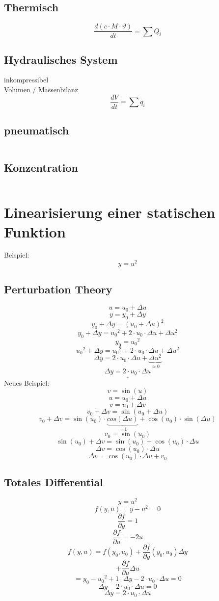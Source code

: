 \subsection{Thermisch}
\[ \boxed{\frac{d(c \cdot M \cdot \vartheta)}{dt} = \sum Q_i} \]

\subsection{Hydraulisches System}
inkompressibel \\
Volumen / Massenbilanz
\[ \boxed{\frac{dV}{dt} = \sum q_i} \]

\subsection{pneumatisch}
\[ \boxed{} \]

\subsection{Konzentration}
\[ \boxed{} \]

\section{Linearisierung einer statischen Funktion}
Beispiel: 
\[ y = u^2 \]

\subsection{Perturbation Theory}
\[ u = u_0 + \Delta u \]
\[ y = y_0 + \Delta y \]
\[ y_0 + \Delta y = (u_0 + \Delta u)^2 \]
\[ y_0 + \Delta y = {u_0}^2 + 2 \cdot u_0 \cdot \Delta u + \Delta u ^2 \]
\[ y_0 = {u_0}^2 \]
\[ {u_0}^2 + \Delta y = {u_0}^2 + 2 \cdot u_0 \cdot \Delta u + \Delta u^2 \]
\[ \Delta y = 2 \cdot u_0 \cdot \Delta u + \underbrace{\Delta u^2}_{\approx 0} \]
\[ \underline{\underline{\Delta y = 2 \cdot u_0 \cdot \Delta u}} \]
%
Neues Beispiel: 
\[ v = \sin(u) \]
\[ u = u_0 + \Delta u \]
\[ v = v_0 + \Delta v \]
\[ v_0 + \Delta v = \sin(u_0 + \Delta u) \]
\[ v_0 + \Delta v = \sin(u_0) \cdot \underbrace{cos(\Delta u)}_{=1} 
+ \cos(u_0) \cdot \sin(\Delta u) \]
\[ v_0 = \sin(u_0) \]
\[ \sin(u_0) + \Delta v = \sin(u_0) + \cos(u_0) \cdot \Delta u \]
\[ \Delta v = \cos(u_0) \cdot \Delta u \]
\[ \Delta v = \cos(u_0) \cdot \Delta u + v_0 \]

\subsection{Totales Differential}
\[ y = u^2 \]
\[ f(y, u) = y - u^2 = 0 \]
\[ \frac{\partial f}{\partial y} = 1 \]
\[ \frac{\partial f}{\partial u} = -2u \]
\[ f(y, u) = f(y_0, u_0) + \frac{\partial f}{\partial y}(y_0, u_0) \Delta y \]
\[ + \frac{\partial f}{\partial u} \Delta u \]
\[ = y_0 - {u_0}^2 + 1 \cdot \Delta y - 2 \cdot u_0 \cdot \Delta u = 0 \]
\[ \Delta y - 2 \cdot u_0 \cdot \Delta u = 0 \]
\[ \Delta y = 2 \cdot u_0 \cdot \Delta u \]